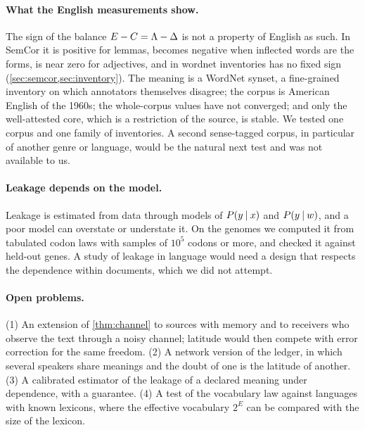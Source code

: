 \paragraph{What the English measurements show.} The sign of the balance $E-C=\Lambda-\Delta$ is not a property of English as such. In SemCor it is positive for lemmas, becomes negative when inflected words are the forms, is near zero for adjectives, and in wordnet inventories has no fixed sign (\cref{sec:semcor,sec:inventory}). The meaning is a WordNet synset, a fine-grained inventory on which annotators themselves disagree; the corpus is American English of the 1960s; the whole-corpus values have not converged; and only the well-attested core, which is a restriction of the source, is stable. We tested one corpus and one family of inventories. A second sense-tagged corpus, in particular of another genre or language, would be the natural next test and was not available to us.

\paragraph{Leakage depends on the model.} Leakage is estimated from data through models of $P(y\mathbin{\vert} x)$ and $P(y\mathbin{\vert} w)$, and a poor model can overstate or understate it. On the genomes we computed it from tabulated codon laws with samples of $10^5$ codons or more, and checked it against held-out genes. A study of leakage in language would need a design that respects the dependence within documents, which we did not attempt.

\paragraph{Open problems.}
(1) An extension of \cref{thm:channel} to sources with memory and to receivers who observe the text through a noisy channel; latitude would then compete with error correction for the same freedom.
(2) A network version of the ledger, in which several speakers share meanings and the doubt of one is the latitude of another.
(3) A calibrated estimator of the leakage of a declared meaning under dependence, with a guarantee.
(4) A test of the vocabulary law against languages with known lexicons, where the effective vocabulary $2^E$ can be compared with the size of the lexicon.

